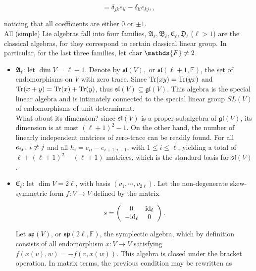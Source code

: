 \documentclass{homework}
\begin{document}
\begin{equation}
    [e_{ij}, e_{kl}] = \delta_{jk} e_{il} - \delta_{li} e_{kj},,
\end{equation}

noticing that all coefficients are either 0 or $\pm 1$. \\

All (simple) Lie algebras fall into four families, $\mathfrak{A}_{\ell}, \mathfrak{B}_{\ell},\mathfrak{C}_{\ell}, \mathfrak{D}_{\ell}$ ($\ell > 1$) are the classical algebras, for they correspond to certain classical linear group. In particular, for the last three families, let $\textnormal{char } \mathds{F} \neq 2$. 

\begin{itemize}
    \item $\mathfrak{A}_{\ell}$: let $\dim V = \ell + 1$. Denote by $\mathfrak{s}\mathfrak{l}(V), $ or $\mathfrak{s}\mathfrak{l}(\ell + 1, \mathds{F})$, the set of endomorphisms on $V$ with zero trace. Since $\Tr(xy) = \Tr(yx)$ and $\Tr(x+y) = \Tr(x) + \Tr(y)$, thus $\mathfrak{s}\mathfrak{l}(V) \subseteq \mathfrak{g}\mathfrak{l}(V)$. This algebra is the special linear algebra and is intimately connected to the special linear group $SL(V)$ of endomorphisms of unit determinant. \\
    
    What about its dimension? since  $\mathfrak{s}\mathfrak{l}(V)$ is a proper subalgebra of $\mathfrak{g}\mathfrak{l}(V)$, its dimension is at most $(\ell + 1)^2 - 1$. On the other hand, the number of linearly independent matrices of zero-trace can be readily found. For all $e_{ij}, \textnormal{ } i \neq j$ and all $h_i = e_{ii} - e_{i+1, i+1}$, with $1 \leq i \leq \ell$, yielding a total of $\ell + (\ell+1)^2 - (\ell + 1) $ matrices, which is the standard basis for $\mathfrak{s}\mathfrak{l}(V)$. \\
    
    \item $\mathfrak{C}_{\ell}$: let $\dim V = 2\ell$, with basis $(v_1, \cdots, v_{2\ell})$. Let the non-degenerate skew-symmetric form $f: V \rightarrow V$ defined by the matrix 
    
    $$
        s = \left(\begin{array}{cc}
           0 & \textnormal{i}\textnormal{d}_{\ell}  \\
            - \textnormal{i}\textnormal{d}_{\ell} & 0 
        \end{array}\right).
    $$
    
    Let $\mathfrak{s}\mathfrak{p}(V)$, or $\mathfrak{s}\mathfrak{p}(2\ell, \mathds{F})$, the symplectic algebra, which by definition consists of all endomorphism $x: V \rightarrow V$ satisfying $f(x(v), w) = - f(v, x(w))$. This algebra is closed under the bracket operation. In matrix terms, the previous condition may be rewritten as 
    

\end{itemize}
\end{document}
